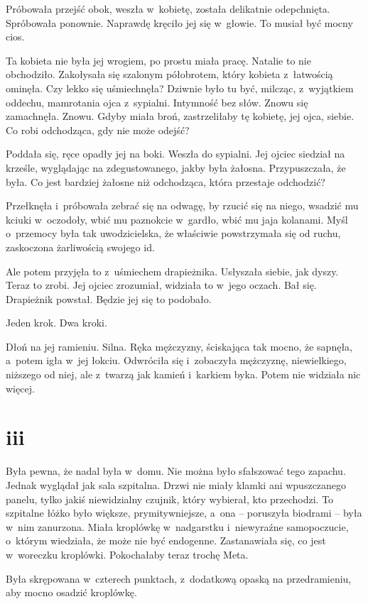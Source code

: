 \documentclass[oneside,polish,11pt,sfheadings]{mwbk}
\begin{document}
Próbowała przejść obok, weszła w~kobietę, została delikatnie
odepchnięta. Spróbowała ponownie. Naprawdę kręciło jej się w~głowie. To
musiał być mocny cios.

Ta kobieta nie była jej wrogiem, po prostu miała pracę. Natalie to nie
obchodziło. Zakołysała się szalonym półobrotem, który kobieta z~łatwością ominęła. Czy lekko się uśmiechnęła? Dziwnie było tu być,
milcząc, z~wyjątkiem oddechu, mamrotania ojca z~sypialni. Intymność bez
słów. Znowu się zamachnęła. Znowu. Gdyby miała broń, zastrzeliłaby tę
kobietę, jej ojca, siebie. Co robi odchodząca, gdy nie może odejść?

Poddała się, ręce opadły jej na boki. Weszła do sypialni. Jej ojciec
siedział na krześle, wyglądając na zdegustowanego, jakby była żałosna.
Przypuszczała, że była. Co jest bardziej żałosne niż odchodząca, która
przestaje odchodzić?

Przełknęła i~próbowała zebrać się na odwagę, by rzucić się na niego,
wsadzić mu kciuki w~oczodoły, wbić mu paznokcie w~gardło, wbić mu jaja
kolanami. Myśl o~przemocy była tak uwodzicielska, że właściwie
powstrzymała się od ruchu, zaskoczona żarliwością swojego id.

Ale potem przyjęła to z~uśmiechem drapieżnika. Usłyszała siebie, jak
dyszy. Teraz to zrobi. Jej ojciec zrozumiał, widziała to w~jego oczach.
Bał się. Drapieżnik powstał. Będzie jej się to podobało.

Jeden krok. Dwa kroki.

Dłoń na jej ramieniu. Silna. Ręka mężczyzny, ściskająca tak mocno, że
sapnęła, a~potem igła w~jej łokciu. Odwróciła się i~zobaczyła mężczyznę,
niewielkiego, niższego od niej, ale z~twarzą jak kamień i~karkiem byka.
Potem nie widziała nic więcej.

\chapter*{iii}

Była pewna, że nadal była w~domu. Nie można było sfałszować tego
zapachu. Jednak wyglądał jak sala szpitalna. Drzwi nie miały klamki ani
wpuszczanego panelu, tylko jakiś niewidzialny czujnik, który wybierał,
kto przechodzi. To szpitalne łóżko było większe, prymitywniejsze, a~ona
-- poruszyła biodrami -- była w~nim zanurzona. Miała kroplówkę w~nadgarstku i~niewyraźne samopoczucie, o~którym wiedziała, że może nie
być endogenne. Zastanawiała się, co jest w~woreczku kroplówki.
Pokochałaby teraz trochę Meta.

Była skrępowana w~czterech punktach, z~dodatkową opaską na
przedramieniu, aby mocno osadzić kroplówkę.
\end{document}
